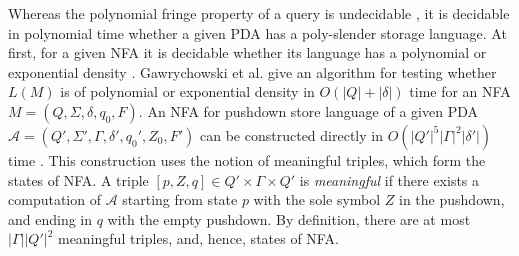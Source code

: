 Whereas the polynomial fringe property of a query is undecidable \cite{Ullman}, it is decidable in polynomial time whether a given PDA has a poly-slender storage language. At first, for a given NFA it is decidable whether its language has a polynomial or exponential density \cite*{sparseness, poldens}. Gawrychowski et al. \cite{Gawrychowski} give an algorithm for testing whether $L(M)$ is of polynomial or exponential density in $O(|Q| + |\delta|)$ time for an NFA $M = (Q,\Sigma,\delta ,q_{0},F)$. An NFA for pushdown store language of a given PDA $\mathcal{A} = (Q', \Sigma', \Gamma, \delta', q_0', Z_0, F')$ can be constructed directly in $O({|Q'|}^5{|\Gamma|}^2|\delta'|)$ time \cite{PSLDirect}. This construction uses the notion of meaningful triples, which form the states of NFA. A triple $[p, Z, q] \in Q' \times \Gamma \times Q'$ is \textit{meaningful} if there exists a computation of $\mathcal{A}$ starting from state $p$ with the sole symbol $Z$ in the pushdown, and ending in $q$ with the empty pushdown. By definition, there are at most $|\Gamma|{|Q'|}^2$ meaningful triples, and, hence, states of NFA. 